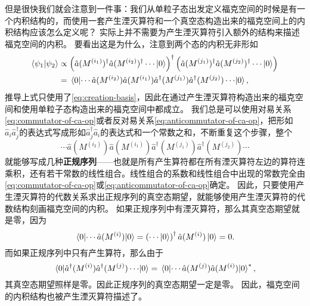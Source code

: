 \documentclass[UTF8, a4paper]{ctexart}
\begin{document}
但是很快我们就会注意到一件事：我们从单粒子态出发定义福克空间的时候是有一个内积结构的，而使用一套产生湮灭算符和一个真空态构造出来的福克空间上的内积结构应该怎么定义呢？
实际上并不需要为产生湮灭算符引入额外的结构来描述福克空间的内积。
要看出这是为什么，注意到两个态的内积无非形如
\[
    \begin{aligned}
        \braket{\psi_1}{\psi_2} &\propto \left( \hat{a}(M^{(i_1)})^\dagger \hat{a}(M^{(i_2)})^\dagger \cdots \ket{0} \right)^\dagger \left( \hat{a}(M^{(j_1)})^\dagger \hat{a}(M^{(j_2)})^\dagger \cdots \ket{0} \right) \\
        &= \mel{0}{\cdots \hat{a}(M^{(i_2)}) \hat{a}(M^{(i_1)}) \hat{a}^\dagger(M^{(j_1)}) \hat{a}^\dagger (M^{(j_2)}) \cdots }{0},
    \end{aligned}
\]
推导上式只使用了\eqref{eq:creation-basis}，因此在通过产生湮灭算符构造出来的福克空间和使用单粒子态构造出来的福克空间中都成立。
我们总是可以使用对易关系\eqref{eq:commutator-of-ca-op}或者反对易关系\eqref{eq:anticommutator-of-ca-op}，把形如$\hat{a}_i \hat{a}^\dagger_j$的表达式写成形如$\hat{a}^\dagger_j \hat{a}_i$的表达式和一个常数之和，不断重复这个步骤，整个
\[
    \cdots \hat{a}(M^{(i_2)}) \hat{a}(M^{(i_1)}) \hat{a}^\dagger(M^{(j_1)}) \hat{a}^\dagger (M^{(j_2)}) \cdots
\]
就能够写成几种\textbf{正规序列}——也就是所有产生算符都在所有湮灭算符左边的算符连乘积，还有若干常数的线性组合。线性组合的系数和线性组合中出现的常数完全由\eqref{eq:commutator-of-ca-op}或\eqref{eq:anticommutator-of-ca-op}确定。
因此，只要使用产生湮灭算符的代数关系求出正规序列的真空态期望，就能够使用产生湮灭算符的代数结构刻画福克空间的内积。
如果正规序列中有湮灭算符，那么其真空态期望就是零，因为
\[
    \mel{0}{\cdots \hat{a}(M^{(i)})}{0} = \left( \cdots \ket{0} \right)^\dagger \hat{a}(M^{(i)}) \ket{0} = 0.
\]
而如果正规序列中只有产生算符，那么由于
\[
    \mel{0}{\hat{a}^\dagger(M^{(i)}) \hat{a}^\dagger(M^{(j)}) \cdots}{0} = \mel{0}{\cdots \hat{a}(M^{(j)}) \hat{a}(M^{(i)})}{0}^*,
\]
其真空态期望照样是零。因此正规序列的真空态期望一定是零。
因此，福克空间的内积结构也被产生湮灭算符描述了。
\end{document}
